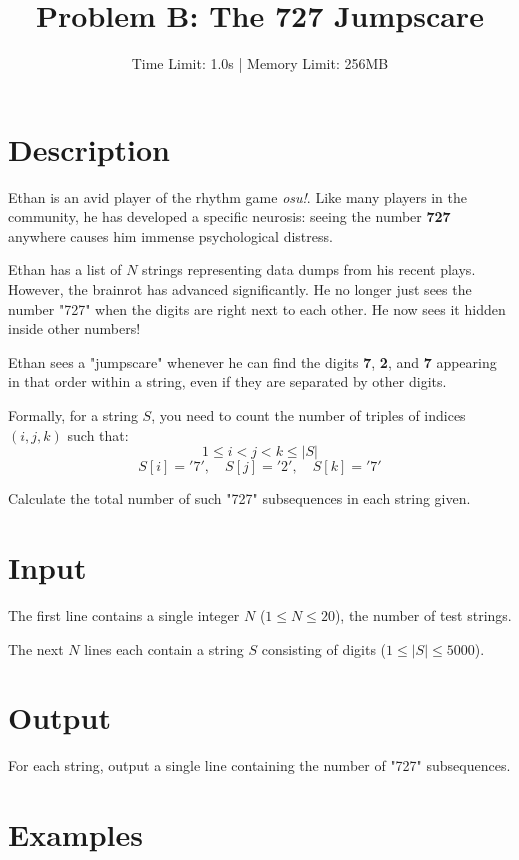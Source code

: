 \documentclass[11pt, letterpaper]{article}
\title{\textbf{Problem B: The 727 Jumpscare}}
\author{Time Limit: 1.0s | Memory Limit: 256MB}
\date{}
\begin{document}
\maketitle

\section*{Description}

Ethan is an avid player of the rhythm game \textit{osu!}. Like many players in the community, he has developed a specific neurosis: seeing the number \textbf{727} anywhere causes him immense psychological distress.

Ethan has a list of $N$ strings representing data dumps from his recent plays. However, the brainrot has advanced significantly. He no longer just sees the number "727" when the digits are right next to each other. He now sees it hidden inside other numbers!

Ethan sees a "jumpscare" whenever he can find the digits \textbf{7}, \textbf{2}, and \textbf{7} appearing in that order within a string, even if they are separated by other digits.

Formally, for a string $S$, you need to count the number of triples of indices $(i, j, k)$ such that:
\[ 1 \le i < j < k \le |S| \]
\[ S[i] = '7', \quad S[j] = '2', \quad S[k] = '7' \]

Calculate the total number of such "727" subsequences in each string given.

\section*{Input}

The first line contains a single integer $N$ ($1 \le N \le 20$), the number of test strings.

The next $N$ lines each contain a string $S$ consisting of digits ($1 \le |S| \le 5000$).

\section*{Output}

For each string, output a single line containing the number of "727" subsequences.

\section*{Examples}
\end{document}
